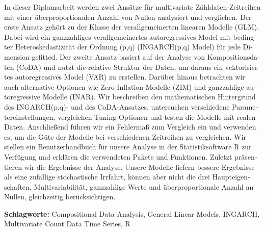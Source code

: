 \begin{otherlanguage}{german}

In dieser Diplomarbeit werden zwei Ansätze für multivariate Zähldaten-Zeitreihen mit einer überproportionalen Anzahl von Nullen analysiert und verglichen. Der erste Ansatz gehört zu der Klasse der verallgemeinerten linearen Modelle (GLM). Dabei wird ein ganzzahliges verallgemeinertes autoregressives Model mit bedingter Heteroskedastizität der Ordnung (p,q) (INGARCH(p,q) Model) für jede Dimension gefitted. Der zweite Ansatz basiert auf der Analyse von Kompositionsdaten (CoDA) und nutzt die relative Struktur der Daten, um daraus ein vektorisiertes autoregressives Model (VAR) zu erstellen. Darüber hinaus betrachten wir auch alternative Optionen wie Zero-Inflation-Modelle (ZIM) und ganzzahlige autoregressive Modelle (INAR). Wir beschreiben den mathematischen Hintergrund des INGARCH(p,q)- und des CoDA-Ansatzes, untersuchen verschiedene Parametereinstellungen, vergleichen Tuning-Optionen und testen die Modelle mit realen Daten. Anschließend führen wir ein Fehlermaß zum Vergleich ein und verwenden es, um die Güte der Modelle bei verschiedenen Zeitreihen zu vergleichen. Wir stellen ein Benutzerhandbuch für unsere Analyse in der Statistiksoftware R zur Verfügung und erklären die verwendeten Pakete und Funktionen. Zuletzt präsentieren wir die Ergebnisse der Analyse. Unsere Modelle liefern bessere Ergebnisse als eine zufällige stochastische Irrfahrt, können aber nicht die drei Haupteigenschaften, Multivariabilität, ganzzahlige Werte und überproportionale Anzahl an Nullen, gleichzeitig berücksichtigen.  \newline

\textbf{Schlagworte:} Compositional Data Analysis, General Linear Models, INGARCH, Multivariate Count Data Time Series, R

\end{otherlanguage}
